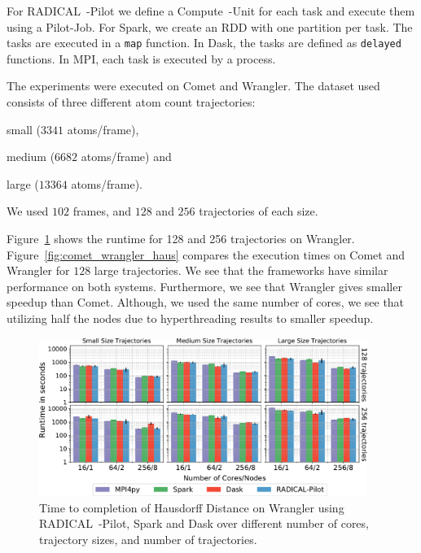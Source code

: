 For RADICAL~-Pilot we define a Compute~-Unit for each task and execute them using a Pilot-Job. 
For Spark, we create an RDD with one partition per task.
The tasks are executed in a \texttt{map} function.
In Dask, the tasks are defined as \texttt{delayed} functions.
In MPI, each task is executed by a process.

The experiments were executed on Comet and Wrangler. 
The dataset used consists of three different atom count trajectories: 
\begin{inparaenum}[1)]
    \item small ($3341$ atoms/frame), 
    \item medium ($6682$ atoms/frame) and 
    \item large ($13364$ atoms/frame).
\end{inparaenum}
We used $102$ frames, and $128$ and $256$ trajectories of each size.

Figure~\ref{fig:HausdorffWrangler} shows the runtime for 128 and 256 trajectories on Wrangler.
Figure~\ref{fig:comet_wrangler_haus} compares the execution times on Comet and Wrangler for $128$ large trajectories.
We see that the frameworks have similar performance on both systems.
Furthermore, we see that Wrangler gives smaller speedup than Comet.
Although, we used the same number of cores, we see that utilizing half the nodes due to hyperthreading results to smaller speedup.

\begin{figure}[t]
    \centering
    \includegraphics[width=0.95\textwidth]{figures/data_analytics_hpc/task_par/HausdorffSingleFig.pdf}
    \caption{Time to completion of Hausdorff Distance on Wrangler using RADICAL~-Pilot, Spark and Dask over different number of cores, trajectory sizes, and number of trajectories.}
            \label{fig:HausdorffWrangler}
\end{figure}

